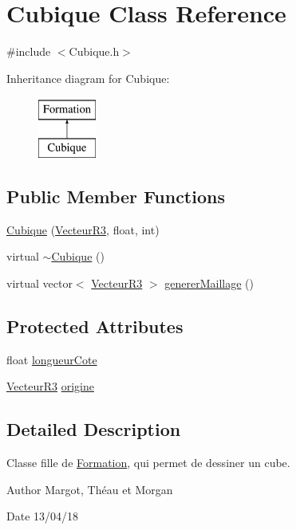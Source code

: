 \hypertarget{class_cubique}{}\section{Cubique Class Reference}
\label{class_cubique}


{\ttfamily \#include $<$Cubique.\+h$>$}

Inheritance diagram for Cubique\+:\begin{figure}[H]
\begin{center}
\leavevmode
\includegraphics[height=2.000000cm]{class_cubique}
\end{center}
\end{figure}
\subsection*{Public Member Functions}
\begin{DoxyCompactItemize}
\item 
\mbox{\hyperlink{class_cubique_ae437848fa7a382f250cf84d9b5c35154}{Cubique}} (\mbox{\hyperlink{class_vecteur_r3}{Vecteur\+R3}}, float, int)
\item 
virtual \mbox{\hyperlink{class_cubique_a5880f332af7c4f412b74ae9a6a71909a}{$\sim$\+Cubique}} ()
\item 
virtual vector$<$ \mbox{\hyperlink{class_vecteur_r3}{Vecteur\+R3}} $>$ \mbox{\hyperlink{class_cubique_a9a3988f05aa6bacdf2cc660fef17138e}{generer\+Maillage}} ()
\end{DoxyCompactItemize}
\subsection*{Protected Attributes}
\begin{DoxyCompactItemize}
\item 
float \mbox{\hyperlink{class_cubique_a2d8ca11e6bf2f6b73aad6ca1f595990e}{longueur\+Cote}}
\item 
\mbox{\hyperlink{class_vecteur_r3}{Vecteur\+R3}} \mbox{\hyperlink{class_cubique_ab9d0ac86eeba76c72022bd84c401bb59}{origine}}
\end{DoxyCompactItemize}


\subsection{Detailed Description}
Classe fille de \mbox{\hyperlink{class_formation}{Formation}}, qui permet de dessiner un cube. \begin{DoxyAuthor}{Author}
Margot, Théau et Morgan 
\end{DoxyAuthor}
\begin{DoxyDate}{Date}
13/04/18 
\end{DoxyDate}


